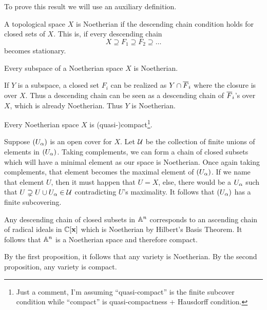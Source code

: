 \documentclass[12pt]{memoir}
\begin{document}
To prove this result we will use an auxiliary definition.

\begin{Def}
A topological space $X$ is Noetherian if the descending chain condition holds for closed sets of $X$. This is, if every descending chain 
$$X\supseteq F_1\supseteq F_2\supseteq\dots$$
becomes stationary.
\end{Def}

\begin{Prop}
  Every subspace of a Noetherian space $X$ is Noetherian.
  \end{Prop}

\begin{ptcbp}
  If $Y$ is a subspace, a closed set $F_i$ can be realized as $Y\cap\overline{F}_i$ where the closure is over $X$. Thus a descending chain can be seen as a descending chain of $\overline F_i$'s over $X$, which is already Noetherian. Thus $
  Y$ is Noetherian.
\end{ptcbp}
\begin{Prop}
Every Noetherian space $X$ is (quasi-)compact\footnote{Just a comment, I'm assuming ``quasi-compact'' is the finite subcover condition while ``compact'' is quasi-compactness + Hausdorff condition.}.
\end{Prop}

\begin{ptcbp}
  Suppose $(U_\alpha)$ is an open cover for $X$. Let $\mathcal{U}$ be the collection of finite unions of elements in $(U_\alpha)$. Taking complements, we can form a chain of closed subsets which will have a minimal element as our space is Noetherian. Once again taking complements, that element becomes the maximal element of $(U_\alpha)$. If we name that element $U$, then it must happen that $U=X$, else, there would be a $U_\alpha$ such that $U\supsetneq U\cup U_\alpha\in\mathcal{U}$ contradicting $U$'s maximality. It follows that $(U_\alpha)$ has a finite subcovering.
\end{ptcbp}

\begin{ptcbr}
  Any descending chain of closed subsets in $\mathbb{A}^n$ corresponds to an ascending chain of radical ideals in $\mathbb{C}[\mathbf{x}]$ which is Noetherian by Hilbert's Basis Theorem. It follows that $\mathbb{A}^n$ is a Noetherian space and therefore compact.\par 
  By the first proposition, it follows that any variety is Noetherian. By the second proposition, any variety is compact.
\end{ptcbr}
\end{document}
